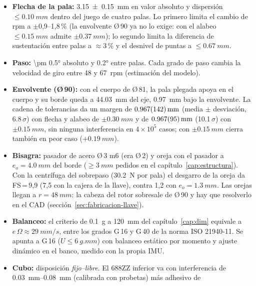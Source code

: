 \begin{resultado}
\begin{itemize}[leftmargin=*]
  \item \textbf{Flecha de la pala:} \SI{3.15 \pm 0.15}{mm} en valor absoluto y dispersión
        $\le\SI{0.10}{mm}$ dentro del juego de cuatro palas. Lo primero limita el cambio de
        rpm a $\pm$0,9--1,8\,\% (la envolvente Ø\,90 ya no lo exige: con el alabeo $\le\SI{0.15}{mm}$ admite $\pm\SI{0.37}{mm}$); lo segundo
        limita la diferencia de sustentación entre palas a $\approx3$\,\% y el desnivel de
        puntas a $\le\SI{0.67}{mm}$.
  \item \textbf{Paso:} \ang{\pm 0.5} absoluto y \ang{0.2} entre palas. Cada grado de
        paso cambia la velocidad de giro entre 48 y \SI{67}{rpm} (estimación del modelo).
  \item \textbf{Envolvente (Ø\,90):} con el cuerpo de Ø\,81, la pala plegada apoya en el cuerpo y su
        borde queda a \SI{44.03}{mm} del eje, \SI{0.97}{mm} bajo la envolvente. La cadena de
        tolerancias da un margen de $\SI{0.967 \pm 0.142}{mm}$ (media $\pm$ desviación, \num{6.8}\,$\sigma$) con flecha y
        alabeo de $\pm\SI{0.30}{mm}$ y de $\SI{0.967 \pm 0.095}{mm}$ (\num{10.1}\,$\sigma$) con
        $\pm\SI{0.15}{mm}$, sin ninguna interferencia en $4\times10^5$ casos; con $\pm\SI{0.15}{mm}$
        cierra también en peor caso ($+\SI{0.19}{mm}$).
  \item \textbf{Bisagra:} pasador de acero Ø\,3 m6 (era Ø\,2) y oreja con el pasador a
        $e_o=\SI{4.0}{mm}$ del borde ($\ge\SI{3}{mm}$ pedidos en el capítulo~\ref{cap:estructura}). Con la
        centrífuga del sobrepaso (\SI{30.2}{N} por pala) el desgarro de la oreja da FS\,=\,9,9 (7,5 con la
        cajera de la llave), contra 1,2 con $e_o=\SI{1.3}{mm}$. Las orejas llegan a $r=\SI{48}{mm}$: la
        cabeza del rotor sobresale de Ø\,90 y hay que resolverlo en el CAD (sección~\ref{sec:fabricacion-llave}).
  \item \textbf{Balanceo:} el criterio de \SI{0.1}{g} a \SI{120}{mm} del capítulo~\ref{cap:dim}
        equivale a $e\,\Omega\approx\SI{29}{mm/s}$, entre los grados G\,16 y G\,40 de la
        norma ISO 21940-11. Se apunta a G\,16
        ($U\le\SI{6}{g.mm}$) con balanceo estático por momento y ajuste dinámico en el
        banco, medido con la propia IMU.
  \item \textbf{Cubo:} disposición \emph{fijo--libre}. El 688ZZ inferior va con
        interferencia de \SIrange{0.03}{0.08}{mm} (calibrada con probetas) más adhesivo de

\end{itemize}
\end{resultado}
